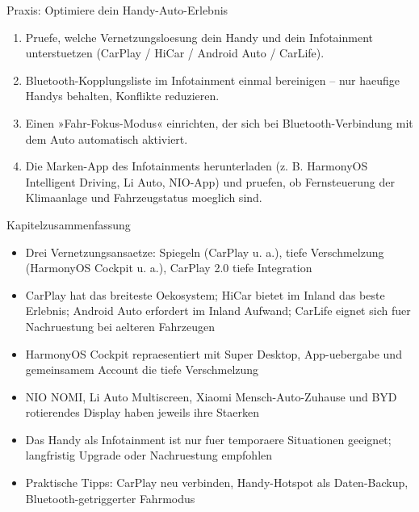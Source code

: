\begin{tcbpractice}{Praxis: Optimiere dein Handy-Auto-Erlebnis}
\begin{enumerate}
  \item Pruefe, welche Vernetzungsloesung dein Handy und dein Infotainment unterstuetzen (CarPlay / HiCar / Android Auto / CarLife).
  \item Bluetooth-Kopplungsliste im Infotainment einmal bereinigen – nur haeufige Handys behalten, Konflikte reduzieren.
  \item Einen »Fahr-Fokus-Modus« einrichten, der sich bei Bluetooth-Verbindung mit dem Auto automatisch aktiviert.
  \item Die Marken-App des Infotainments herunterladen (z. B. HarmonyOS Intelligent Driving, Li Auto, NIO-App) und pruefen, ob Fernsteuerung der Klimaanlage und Fahrzeugstatus moeglich sind.
\end{enumerate}

\end{tcbpractice}

\begin{tcbsummary}{Kapitelzusammenfassung}
\begin{itemize}
  \item Drei Vernetzungsansaetze: Spiegeln (CarPlay u. a.), tiefe Verschmelzung (HarmonyOS Cockpit u. a.), CarPlay 2.0 tiefe Integration
  \item CarPlay hat das breiteste Oekosystem; HiCar bietet im Inland das beste Erlebnis; Android Auto erfordert im Inland Aufwand; CarLife eignet sich fuer Nachruestung bei aelteren Fahrzeugen
  \item HarmonyOS Cockpit repraesentiert mit Super Desktop, App-uebergabe und gemeinsamem Account die tiefe Verschmelzung
  \item NIO NOMI, Li Auto Multiscreen, Xiaomi Mensch-Auto-Zuhause und BYD rotierendes Display haben jeweils ihre Staerken
  \item Das Handy als Infotainment ist nur fuer temporaere Situationen geeignet; langfristig Upgrade oder Nachruestung empfohlen
  \item Praktische Tipps: CarPlay neu verbinden, Handy-Hotspot als Daten-Backup, Bluetooth-getriggerter Fahrmodus
\end{itemize}

\end{tcbsummary}

